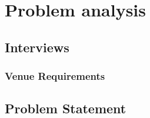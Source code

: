 \chapter{Problem analysis}
\label{cha:problem_analysis}
\section{Interviews}





\subsection{Venue Requirements}


\section{Problem Statement}
\label{ProblemStatement}

